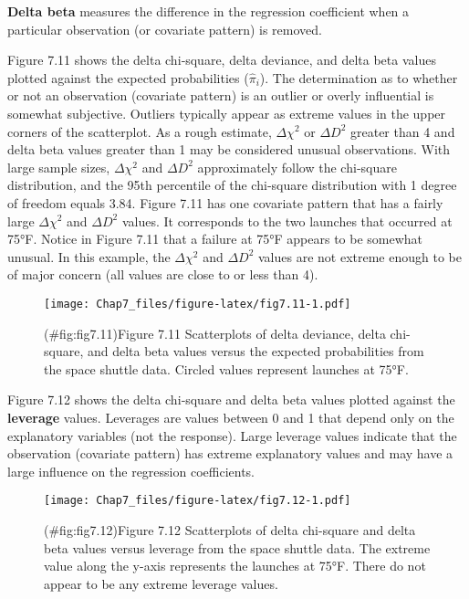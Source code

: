 \documentclass[
]{report}
\begin{document}
\textbf{Delta beta} measures the difference in the regression coefficient when a particular observation (or covariate pattern) is removed.

Figure 7.11 shows the delta chi‐square, delta deviance, and delta beta values plotted against the expected probabilities (\(\hat\pi_i\)). The determination as to whether or not an observation (covariate pattern) is an outlier or overly influential is somewhat subjective. Outliers typically appear as extreme values in the upper corners of the scatterplot. As a rough estimate, \(\Delta\chi^2\) or \(\Delta D^2\) greater than 4 and delta beta values greater than 1 may be considered unusual observations. With large sample sizes, \(\Delta\chi^2\) and \(\Delta D^2\) approximately follow the chi‐square distribution, and the 95th percentile of the chi‐square distribution with 1 degree of freedom equals 3.84. Figure 7.11 has one covariate pattern that has a fairly large \(\Delta\chi^2\) and \(\Delta D^2\) values. It corresponds to the two launches that occurred at 75°F. Notice in Figure 7.11 that a failure at 75°F appears to be somewhat unusual. In this example, the \(\Delta\chi^2\) and \(\Delta D^2\) values are not extreme enough to be of major concern (all values are close to or less than 4).

\begin{figure}
\centering
\texttt{[image: Chap7\_files/figure-latex/fig7.11-1.pdf]}
\caption{(\#fig:fig7.11)Figure 7.11 Scatterplots of delta deviance, delta chi-square, and delta beta values versus the expected probabilities from the space shuttle data. Circled values represent launches at 75°F.}
\end{figure}

Figure 7.12 shows the delta chi‐square and delta beta values plotted against the \textbf{leverage} values. Leverages are values between 0 and 1 that depend only on the explanatory variables (not the response). Large leverage values indicate that the observation (covariate pattern) has extreme explanatory values and may have a large influence on the regression coefficients.

\begin{figure}
\centering
\texttt{[image: Chap7\_files/figure-latex/fig7.12-1.pdf]}
\caption{(\#fig:fig7.12)Figure 7.12 Scatterplots of delta chi-square and delta beta values versus leverage from the space shuttle data. The extreme value along the y-axis represents the launches at 75°F. There do not appear to be any extreme leverage values.}
\end{figure}
\end{document}
